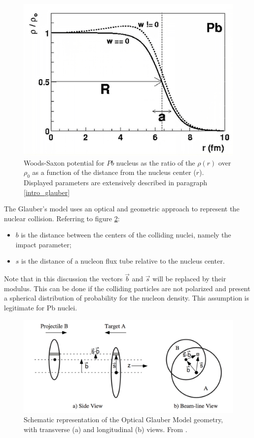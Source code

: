 \begin{figure}[!h]
\begin{center}
\includegraphics[width=0.7\linewidth]{Chapters/Analysis/Figs/woods-saxon.pdf}
\caption{Woods-Saxon potential for $Pb$ nucleus as the ratio of the $\rho(r)$ over $\rho_0$ as a function of the distance from the nucleus center ($r$).
Displayed parameters are extensively described in paragraph \ref{intro_glauber}}
\label{fig:WoodsSaxon}
\end{center}
\end{figure}

The Glauber's model uses an optical and geometric approach to represent the nuclear collision.
Referring to figure \ref{fig:GlauberSide}:
\begin{itemize}
\item $b$ is the distance between the centers of the colliding nuclei, namely the impact parameter;
\item $s$ is the distance of a nucleon flux tube relative to the nucleus center.
\end{itemize}
Note that in this discussion the vectors $\vec{b}$ and $\vec{s}$ will be replaced by their modulus.
This can be done if the colliding particles are not polarized and present a spherical distribution of probability for the nucleon density.
This assumption is legitimate for Pb nuclei.

\begin{figure}[!h]
\begin{center}
\includegraphics[width=0.85\linewidth]{Chapters/Analysis/Figs/glauber-side.pdf}
\caption{Schematic representation of the Optical Glauber Model geometry, with transverse (a) and longitudinal (b) views. From \cite{Miller:2007ri}.}
\label{fig:GlauberSide}
\end{center}
\end{figure}

